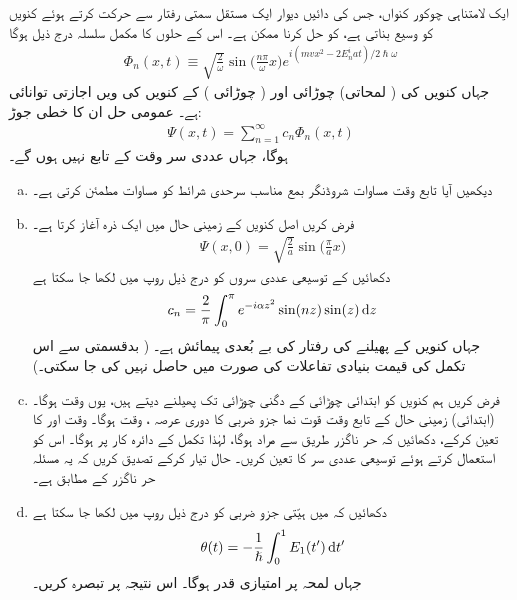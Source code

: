 ایک لامتناہی چوکور کنواں،  جس کی دائیں دیوار ایک مستقل سمتی رفتار  سے حرکت کرتے ہوئے کنویں کو وسیع بناتی ہے،  کو    حل کرنا ممکن ہے۔  اس کے حلوں کا مکمل سلسلہ درج ذیل ہوگا 
\begin{align}\label{مساوات_حر_مکمل_حل_چوکور_کنواں}
\Phi_n (x, t) \equiv \sqrt{\frac{2}{\omega}} \sin \big ( \frac{n \pi}{\omega} x \big ) e^{i(mvx^2 -2E_n^i at)/2\hslash \omega}
\end{align}
جہاں  کنویں کی ( لمحاتی)  چوڑائی اور   ( چوڑائی ) کے   کنویں کی  ویں اجازتی   توانائی  ہے۔ عمومی حل ان  کا  خطی جوڑ:
\begin{align}
\Psi (x, t) = \sum_{n = 1}^{\infty} c_n \Phi_n (x, t)
\end{align}
ہوگا،  جہاں عددی سر  وقت  کے تابع نہیں ہوں گے۔
\begin{enumerate}[a.]
\item
دیکھیں آیا تابع وقت مساوات شروڈنگر بمع مناسب سرحدی شرائط کو مساوات     مطمئن کرتی ہے۔
\item
فرض کریں اصل کنویں کے  زمینی حال میں ایک ذرہ آغاز   کرتا ہے۔
\begin{align*}
\Psi (x, 0) = \sqrt{\frac{2}{a}} \sin \big ( \frac{\pi}{a} x \big )
\end{align*}
دکھائیں کے  توسیعی   عددی سروں کو درج ذیل روپ میں لکھا جا سکتا ہے 
\begin{align}
c_n = \frac{2}{\pi} \int_0^{\pi} e^{-i\alpha z^2} \sin(nz) \sin(z) \dif z
\end{align}
جہاں  کنویں کے پھیلنے کی رفتار کی  بے بُعدی پیمائش ہے۔ ( بدقسمتی سے اس تکمل کی قیمت  بنیادی تفاعلات کی صورت میں حاصل نہیں کی جا سکتی۔) 
\item
فرض کریں ہم کنویں کو ابتدائی چوڑائی کے دگنی چوڑائی تک پھیلنے دیتے ہیں،  یوں    وقت  ہوگا۔  (ابتدائی)  زمینی حال کے تابع وقت قوت نما  جزو ضربی کا دوری عرصہ ،    وقت ہوگا۔ وقت  اور  کا  تعین کرکے،  دکھائیں  کہ  حر ناگزر   طریق  سے مراد  ہوگا،  لہٰذا  تکمل کے
 دائرہ کار پر  ہوگا۔ اس کو استعمال کرتے ہوئے  توسیعی  عددی سر  کا  تعین کریں۔  حال  تیار کرکے تصدیق کریں کہ یہ مسئلہ حر ناگزر کے مطابق ہے۔
\item
دکھائیں کہ   میں    ہیّتی جزو ضربی  کو درج ذیل روپ میں لکھا جا سکتا ہے 
\begin{align}
\theta (t) = - \frac{1}{\hslash} \int_0^1 E_1 (t') \dif t'
\end{align}
جہاں لمحہ  پر   امتیازی قدر  ہوگا۔ اس نتیجہ پر تبصرہ کریں۔
\end{enumerate}
